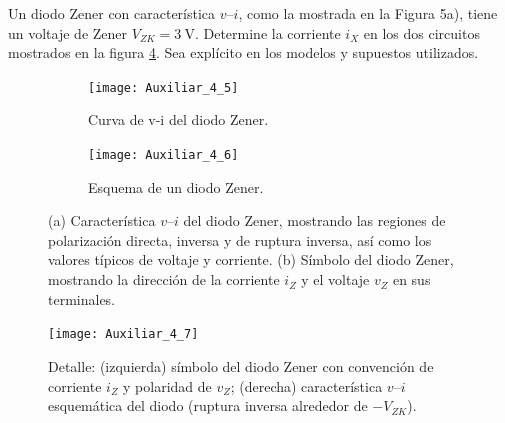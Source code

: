 \documentclass[
  11pt,
  letterpaper,
   addpoints,
   answers
  ]{exam}
\begin{document}
\begin{questions}
    \question Un diodo Zener con característica $v$--$i$, como la mostrada en la Figura 5a), tiene un voltaje de Zener
    $V_{ZK}=3\ \mathrm{V}$. Determine la corriente $i_X$ en los dos circuitos mostrados en la figura \ref{fig:ex4c}. Sea explícito en los modelos y supuestos utilizados.  

\begin{figure}[H]
  \centering

  \begin{subfigure}[b]{0.48\textwidth}
    \centering
    \texttt{[image: Auxiliar\_4\_5]}
    \caption{Curva de v-i del diodo Zener.}
    \label{fig:ex4a}
  \end{subfigure}\hfill
  \begin{subfigure}[b]{0.48\textwidth}
    \centering
    \texttt{[image: Auxiliar\_4\_6]}
    \caption{Esquema de un diodo Zener.}
    \label{fig:ex4b}
  \end{subfigure}

  \caption{ (a) Característica $v$--$i$ del diodo Zener, mostrando las regiones de polarización directa, inversa y de ruptura inversa, así como los valores típicos de voltaje y corriente. (b) Símbolo del diodo Zener, mostrando la dirección de la corriente $i_Z$ y el voltaje $v_Z$ en sus terminales.}
  \label{fig:ex4ab}
\end{figure}


\begin{figure}[H]
  \centering  \texttt{[image: Auxiliar\_4\_7]}
  \caption{Detalle: (izquierda) símbolo del diodo Zener con convención de corriente $i_Z$ y polaridad de $v_Z$; (derecha) característica $v$--$i$ esquemática del diodo (ruptura inversa alrededor de $-V_{ZK}$).}
  \label{fig:ex4c}
\end{figure}




\end{questions}
\end{document}
